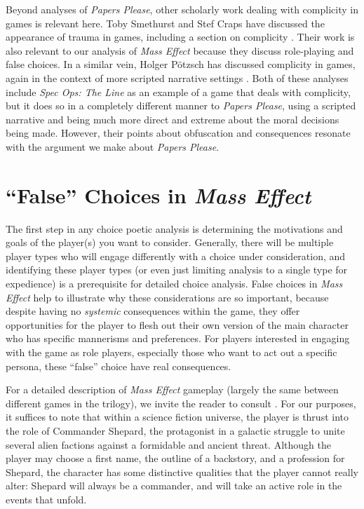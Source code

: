 \documentclass[arts,article,submit,moreauthors,pdftex,10pt,a4paper]{Definitions/mdpi}
\begin{document}
Beyond analyses of \emph{Papers Please}, other scholarly work dealing with complicity in games is relevant here.
%
Toby Smethurst and Stef Craps have discussed the appearance of trauma in games, including a section on complicity \citep{smethurst2015playing}.
%
Their work is also relevant to our analysis of \emph{Mass Effect} because they discuss role-playing and false choices.
%
In a similar vein, Holger Pötzsch has discussed complicity in games, again in the context of more scripted narrative settings \citep{potzsch2017selective}.
%
Both of these analyses include \emph{Spec Ops: The Line} \citep{yager2012spec} as an example of a game that deals with complicity, but it does so in a completely different manner to \emph{Papers Please}, using a scripted narrative and being much more direct and extreme about the moral decisions being made.
%
However, their points about obfuscation and consequences resonate with the argument we make about \emph{Papers Please}.

\section{``False'' Choices in \emph{Mass Effect}}

The first step in any choice poetic analysis is determining the motivations and goals of the player(s) you want to consider.
%
Generally, there will be multiple player types who will engage differently with a choice under consideration, and identifying these player types (or even just limiting analysis to a single type for expedience) is a prerequisite for detailed choice analysis.
%
False choices in \emph{Mass Effect} help to illustrate why these considerations are so important, because despite having no \emph{systemic} consequences within the game, they offer opportunities for the player to flesh out their own version of the main character who has specific mannerisms and preferences.
%
For players interested in engaging with the game as role players, especially those who want to act out a specific persona, these ``false'' choice have real consequences.


For a detailed description of \emph{Mass Effect} gameplay (largely the same between different games in the trilogy), we invite the reader to consult \cite{bizzocchi2012mass}.
%
For our purposes, it suffices to note that within a science fiction universe, the player is thrust into the role of Commander Shepard, the protagonist in a galactic struggle to unite several alien factions against a formidable and ancient threat.
%
Although the player may choose a first name, the outline of a backstory, and a profession for Shepard, the character has some distinctive qualities that the player cannot really alter: Shepard will always be a commander, and will take an active role in the events that unfold.
\end{document}
